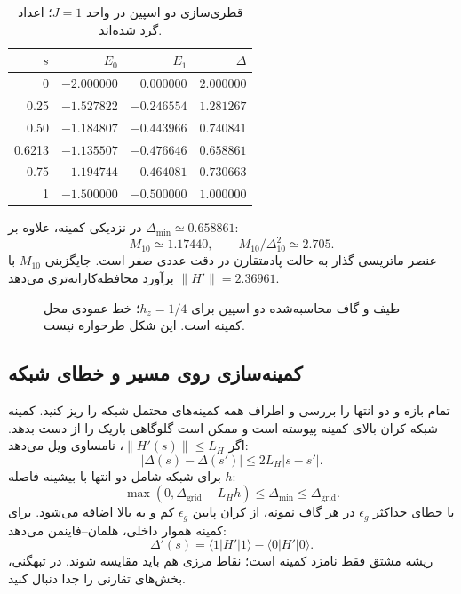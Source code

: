 \begin{table}[htbp]
	\centering\small
	\caption{قطری‌سازی دو اسپین در واحد $J=1$؛ اعداد گرد شده‌اند.}
	\label{tab:gap-two-spin}
	\begin{tabular}{@{}rrrr@{}}
		\toprule $s$&$E_0$&$E_1$&$\Delta$\\ \midrule
		0&$-2.000000$&$0.000000$&$2.000000$\\
		0.25&$-1.527822$&$-0.246554$&$1.281267$\\
		0.50&$-1.184807$&$-0.443966$&$0.740841$\\
		0.6213&$-1.135507$&$-0.476646$&$0.658861$\\
		0.75&$-1.194744$&$-0.464081$&$0.730663$\\
		1&$-1.500000$&$-0.500000$&$1.000000$\\ \bottomrule
	\end{tabular}
\end{table}
در نزدیکی کمینه، علاوه بر $\Delta_{\min}\simeq0.658861$:
\begin{equation}
	M_{10}\simeq1.17440,\qquad M_{10}/\Delta_{10}^2\simeq2.705.
\end{equation}
عنصر ماتریسی گذار به حالت پادمتقارن در دقت عددی صفر است.
جایگزینی $M_{10}$ با $\|H'\|=2.36961$ برآورد محافظه‌کارانه‌تری می‌دهد.

\begin{figure}[htbp]
	\centering
	\caption{طیف و گاف محاسبه‌شده دو اسپین برای $h_z=1/4$؛ خط عمودی محل کمینه است. این شکل طرحواره نیست.}
	\label{fig:gap-computed-spectrum}
\end{figure}

\subsection{کمینه‌سازی روی مسیر و خطای شبکه}
تمام بازه و دو انتها را بررسی و اطراف همه کمینه‌های محتمل شبکه را ریز کنید.
کمینه شبکه کران بالای کمینه پیوسته است و ممکن است گلوگاهی باریک را از دست بدهد.
اگر $\|H'(s)\|\leq L_H$، نامساوی ویل می‌دهد:
\begin{equation}
	|\Delta(s)-\Delta(s')|\leq2L_H|s-s'|.
\end{equation}
برای شبکه شامل دو انتها با بیشینه فاصله $h$:
\begin{equation}
	\max(0,\Delta_{\mathrm{grid}}-L_Hh)\leq\Delta_{\min}\leq\Delta_{\mathrm{grid}}.
	\label{eq:gap-grid-bound}
\end{equation}
با خطای حداکثر $\epsilon_g$ در هر گاف نمونه، از کران پایین $\epsilon_g$ کم و به بالا اضافه می‌شود.
برای کمینه هموار داخلی، هلمان--فاینمن می‌دهد:
\begin{equation}
	\Delta'(s)=\langle1|H'|1\rangle-\langle0|H'|0\rangle.
\end{equation}
ریشه مشتق فقط نامزد کمینه است؛ نقاط مرزی هم باید مقایسه شوند. در تبهگنی، بخش‌های تقارنی را جدا دنبال کنید.

